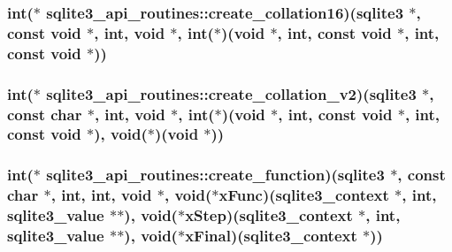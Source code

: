 \hypertarget{structsqlite3__api__routines_a2f05772713bb942bff670352a96ee1e6}{
\subsubsection[{create\-\_\-collation16}]{\setlength{\rightskip}{0pt plus 5cm}int($\ast$ sqlite3\-\_\-api\-\_\-routines\-::create\-\_\-collation16)({\bf sqlite3} $\ast$, const void $\ast$, int, void $\ast$, int($\ast$)(void $\ast$, int, const void $\ast$, int, const void $\ast$))}}\label{structsqlite3__api__routines_a2f05772713bb942bff670352a96ee1e6}
\hypertarget{structsqlite3__api__routines_afeaa51f6fd046328ba845ebcacdeb335}{
\subsubsection[{create\-\_\-collation\-\_\-v2}]{\setlength{\rightskip}{0pt plus 5cm}int($\ast$ sqlite3\-\_\-api\-\_\-routines\-::create\-\_\-collation\-\_\-v2)({\bf sqlite3} $\ast$, const char $\ast$, int, void $\ast$, int($\ast$)(void $\ast$, int, const void $\ast$, int, const void $\ast$), void($\ast$)(void $\ast$))}}\label{structsqlite3__api__routines_afeaa51f6fd046328ba845ebcacdeb335}
\hypertarget{structsqlite3__api__routines_aaf30781efad4fb70111f391e6fe20a9c}{
\subsubsection[{create\-\_\-function}]{\setlength{\rightskip}{0pt plus 5cm}int($\ast$ sqlite3\-\_\-api\-\_\-routines\-::create\-\_\-function)({\bf sqlite3} $\ast$, const char $\ast$, int, int, void $\ast$, void($\ast$x\-Func)({\bf sqlite3\-\_\-context} $\ast$, int, {\bf sqlite3\-\_\-value} $\ast$$\ast$), void($\ast$x\-Step)({\bf sqlite3\-\_\-context} $\ast$, int, {\bf sqlite3\-\_\-value} $\ast$$\ast$), void($\ast$x\-Final)({\bf sqlite3\-\_\-context} $\ast$))}}\label{structsqlite3__api__routines_aaf30781efad4fb70111f391e6fe20a9c}
